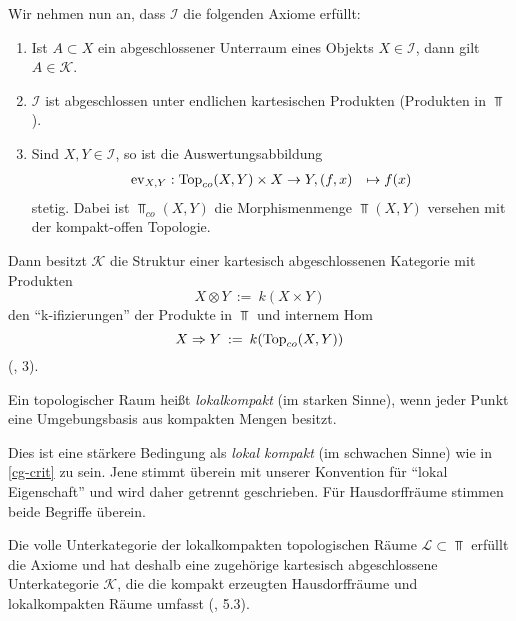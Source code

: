 Wir nehmen nun an, dass $\mathcal{I}$ die folgenden Axiome erfüllt:
\begin{enumerate}
  \item Ist $A \subset X$ ein abgeschlossener Unterraum eines Objekts
    $X \in \mathcal{I}$, dann gilt $A \in \mathcal{K}$.
  \item $\mathcal{I}$ ist abgeschlossen unter endlichen kartesischen
    Produkten (Produkten in $\Top$).
  \item Sind $X, Y \in \mathcal{I}$, so ist die Auswertungsabbildung
    \begin{align*}
      \operatorname{ev}_{X, Y}: \operatorname{Top}_{co}(X, Y) \times X &\to Y,
      (f, x) &\mapsto f(x)
    \end{align*}
    stetig. Dabei ist $\Top_{co}(X, Y)$ die Morphismenmenge $\Top(X,
    Y)$ versehen mit der kompakt-offen Topologie.
\end{enumerate}
Dann besitzt $\mathcal{K}$ die Struktur einer kartesisch
abgeschlossenen Kategorie mit Produkten
\[ X \otimes Y \: := \: k(X \times Y) \]
den ``k-ifizierungen'' der Produkte in $\Top$ und internem Hom
\[ X \Rightarrow Y \: := \: k(\operatorname{Top}_{co}(X, Y)) \] 
(\cite{Vogt}, 3).

\begin{defn}
  Ein topologischer Raum heißt \emph{lokalkompakt} (im starken Sinne),
  wenn jeder Punkt eine Umgebungsbasis aus kompakten Mengen besitzt.
\end{defn}
\begin{bem}
  Dies ist eine stärkere Bedingung als \emph{lokal kompakt} (im
  schwachen Sinne) wie in \ref{cg-crit} zu sein. Jene stimmt überein
  mit unserer Konvention für ``lokal Eigenschaft'' und wird daher
  getrennt geschrieben. Für Hausdorffräume stimmen beide Begriffe
  überein.
\end{bem}
Die volle Unterkategorie der lokalkompakten topologischen Räume
$\mathcal{L} \subset \Top$ erfüllt die Axiome und hat deshalb eine
zugehörige kartesisch abgeschlossene Unterkategorie $\mathcal{K}$, die
die kompakt erzeugten Hausdorffräume und lokalkompakten Räume umfasst
(\cite{Vogt}, 5.3).

